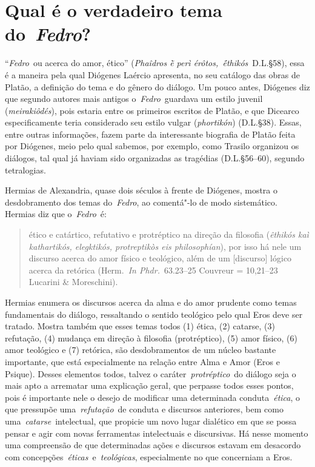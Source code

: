  

\section{Qual é o verdadeiro tema do~\emph{Fedro}?}

 

``\emph{Fedro}~ou acerca do amor, ético'' (\emph{Phaîdros ḕ perì
érôtos,~ḗthikós}~D.L.§58), essa é a maneira pela qual Diógenes Laércio
apresenta, no seu catálogo das obras de Platão, a definição do tema e do
gênero do diálogo. Um pouco antes, Diógenes diz que segundo autores mais
antigos o~\emph{Fedro}~guardava um estilo juvenil (\emph{meirakiôdés}),
pois estaria entre os primeiros escritos de Platão, e que Dicearco
especificamente teria considerado seu estilo vulgar (\emph{phortikón})
(D.L.§38). Essas, entre outras informações, fazem parte da interessante
biografia de Platão feita por Diógenes, meio pelo qual sabemos, por
exemplo, como Trasilo organizou os diálogos, tal qual já haviam sido
organizadas as tragédias (D.L.§56--60), segundo tetralogias.

Hermias de Alexandria, quase dois séculos à frente de Diógenes, mostra o
desdobramento dos temas do~\emph{Fedro}, ao comentá"-lo de modo
sistemático. Hermias diz que o~\emph{Fedro}~é:

 

\begin{quote}
\redondo{[…]} ético e catártico, refutativo e protréptico na direção da
filosofia (\emph{êthikós kaì kathartikós, elegktikós, protreptikòs eis
philosophían}), por isso há nele um discurso acerca do amor físico e
teológico, além de um [discurso] lógico acerca da retórica
(Herm.~\emph{In Phdr.}~63.23--25 Couvreur = 10,21--23 Lucarini \&
Moreschini).
\end{quote}

 

Hermias enumera os discursos acerca da alma e do amor prudente como
temas fundamentais do diálogo, ressaltando o sentido teológico pelo qual
Eros deve ser tratado. Mostra também que esses temas todos (1) ética,
(2) catarse, (3) refutação, (4) mudança em direção à filosofia
(protréptico), (5) amor físico, (6) amor teológico e (7) retórica, são
desdobramentos de um núcleo bastante importante, que está especialmente
na relação entre Alma e Amor (Eros e Psique). Desses elementos todos,
talvez o caráter~\emph{protréptico}~do diálogo seja o mais apto a
arrematar uma explicação geral, que perpasse todos esses pontos, pois é
importante nele o desejo de modificar uma determinada
conduta~\emph{ética}, o que pressupõe uma~\emph{refutação}~de conduta e
discursos anteriores, bem como uma~\emph{catarse}~intelectual, que
propicie um novo lugar dialético em que se possa pensar e agir com novas
ferramentas intelectuais e discursivas. Há nesse momento uma compreensão
de que determinadas ações e discursos estavam em desacordo com
concepções~\emph{éticas}~e~\emph{teológicas}, especialmente no que
concerniam a Eros.

